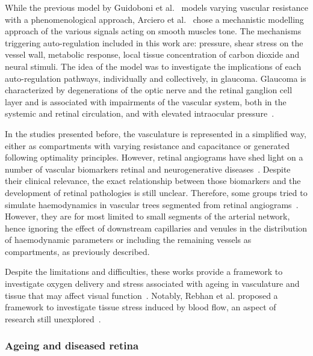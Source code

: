 \documentclass[12pt,a4paper]{journal}
\begin{document}
While the previous model by Guidoboni et al.~\cite{Guidoboni_2014b} models varying vascular resistance with a phenomenological approach, Arciero et al.~\cite{Arciero_2013} chose a mechanistic modelling approach of the various signals acting on smooth muscles tone.
The mechanisms triggering auto-regulation included in this work are: pressure, shear stress on the vessel wall, metabolic response, local tissue concentration of carbon dioxide and neural stimuli.
The idea of the model was to investigate the implications of each auto-regulation pathways, individually and collectively, in glaucoma.
Glaucoma is characterized by degenerations of the optic nerve and the retinal ganglion cell layer and is associated with impairments of the vascular system, both in the systemic and retinal circulation, and with elevated intraocular pressure~\cite{Bonomi_2000, Hulsman_2007}.

In the studies presented before, the vasculature is represented in a simplified way, either as compartments with varying resistance and capacitance or generated following optimality principles.
However, retinal angiograms have shed light on a number of vascular biomarkers retinal and neurogenerative diseases~\cite{Chalam_2016,Tsokolas_2020}.
Despite their clinical relevance, the exact relationship between those biomarkers and the development of retinal pathologies is still unclear.
Therefore, some groups tried to simulate haemodynamics in vascular trees segmented from retinal angiograms~\cite{Aletti_2016, Liu_2009, Malek_2015, Rebhan_2019}.
However, they are for most limited to small segments of the arterial network, hence ignoring the effect of downstream capillaries and venules in the distribution of haemodynamic parameters or including the remaining vessels as compartments, as previously described.

Despite the limitations and difficulties, these works provide a framework to investigate oxygen delivery and stress associated with ageing in vasculature and tissue that may affect visual function~\cite{Rickett_2010,Sim_2013,Wessel_2012}.
Notably, Rebhan et al. proposed a framework to investigate tissue stress induced by blood flow, an aspect of research still unexplored~\cite{Rebhan_2019}.

\break

\subsubsection{Ageing and diseased retina}
\end{document}
